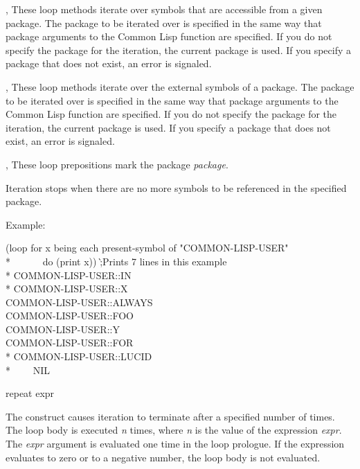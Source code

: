 \begin{new}
\begin{defloop}
\begin{flushdesc}
\item[\cd{symbol}, \cd{symbols}]
These loop methods iterate over symbols that are
accessible from a given package.  The package to be iterated over is specified
in the same way that package arguments to the Common Lisp function
 are specified.  If you do not specify the package 
for the iteration, the current package is used.  If you specify a 
package that does not exist, an error is signaled.

\item[\cd{external-symbol}, \cd{external-symbols}]
These loop methods iterate over the external symbols of a package.
The package to be iterated over is specified in
the same way that package arguments to the Common Lisp function
 are specified.  If you do not specify the package 
for the iteration, the current package is used.  If you specify a 
package that does not exist, an error is signaled.

\item[\cd{in}, \cd{of}]
These loop prepositions mark the package {\it package}.
\end{flushdesc}

Iteration stops when there are no more symbols to be referenced in the
specified package.

Example:
\begin{lisp}
(loop for x being each present-symbol of "COMMON-LISP-USER"  \\*
~~~~~~do (print x)) \`;{\rm Prints 7 lines in this example}\\*
COMMON-LISP-USER::IN  \\*
COMMON-LISP-USER::X  \\
COMMON-LISP-USER::ALWAYS  \\
COMMON-LISP-USER::FOO  \\
COMMON-LISP-USER::Y  \\
COMMON-LISP-USER::FOR  \\*
COMMON-LISP-USER::LUCID  \\*
~~~\EV~NIL
\end{lisp}
\end{defloop}



\begin{defloop}
repeat expr

The  construct causes iteration to terminate after a
specified number of times.
The loop body is executed {\it n} times, where {\it n} is the value 
of the expression {\it expr}.  The {\it expr} argument is evaluated one time
in the loop prologue.  If the expression evaluates to zero or 
to a negative number, the loop body is not evaluated.



\end{defloop}
\end{new}
